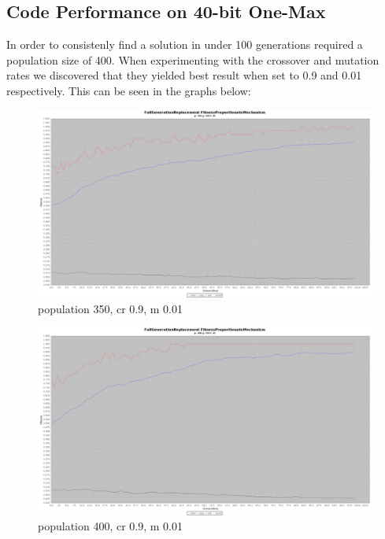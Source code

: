 \subsection{Code Performance on 40-bit One-Max}
	In order to consistenly find a solution in under 100 generations required a population size of 400. When experimenting with the crossover and mutation rates we discovered that they yielded best result when set to 0.9 and 0.01 respectively. This can be seen in the graphs below:
	\begin{figure}[H]
	\includegraphics[width=\columnwidth]{1/c/350.png}%
	\caption{population 350, cr 0.9, m 0.01}%
	\label{fig:350}%
	\end{figure}
	\begin{figure}[H]%
	\includegraphics[width=\columnwidth]{1/c/400.png}%
	\caption{population 400, cr 0.9, m 0.01}%
	\label{fig:400}%
	\end{figure}
	

